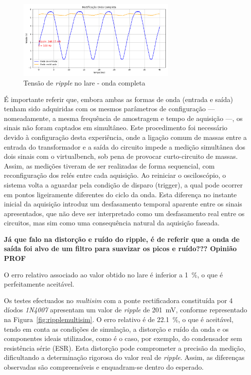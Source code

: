\begin{figure}[hbtp]
	\centering
	\includegraphics[width=0.7\textwidth]{figures/onda-completa.png}
	\caption{Tensão de \textit{ripple} no \acrshort{lare} - onda completa}
	\label{fig:ripplelareonda}
\end{figure}

É importante referir que, embora ambas as formas de onda (entrada e saída) tenham sido adquiridas com os mesmos parâmetros de configuração — nomeadamente, a mesma frequência de amostragem e tempo de aquisição —, os sinais não foram captados em simultâneo. Este procedimento foi necessário devido à configuração desta experiência, onde a ligação comum de massas entre a entrada do transformador e a saída do circuito impede a medição simultânea dos dois sinais com o \acrshort{virtualbench}, sob pena de provocar curto-circuito de massas. Assim, as medições tiveram de ser realizadas de forma sequencial, com reconfiguração dos relés entre cada aquisição. Ao reiniciar o osciloscópio, o sistema volta a aguardar pela condição de disparo (trigger), a qual pode ocorrer em pontos ligeiramente diferentes do ciclo da onda. Esta diferença no instante inicial da aquisição introduz um desfasamento temporal aparente entre os sinais apresentados, que não deve ser interpretado como um desfasamento real entre os circuitos, mas sim como uma consequência natural da aquisição faseada.

\textbf{Já que falo na distorção e ruído do ripple, é de referir que a onda de saída foi alvo de um filtro para suavizar os picos e ruído??? Opinião PROF}

O erro relativo associado ao valor obtido no \acrshort{lare} é inferior a \SI{1}{\percent}, o que é perfeitamente aceitável.

Os testes efectuados no \textit{multisim} com a ponte rectificadora constituída por 4 díodos \textit{1N4007} apresentam um valor de \textit{ripple} de \SI{201}{\milli\volt}, conforme representado na Figura~\ref{fig:ripplemultisim}. O erro relativo é de \SI{22.1}{\percent}, o que é aceitável, tendo em conta as condições de simulação, a distorção e ruído da onda e os componentes ideais utilizados, como é o caso, por exemplo, do condensador sem resistência série (ESR). Esta distorção pode comprometer a precisão da medição, dificultando a determinação rigorosa do valor real de \textit{ripple}.  Assim, as diferenças observadas são compreensíveis e enquadram-se dentro do esperado.

